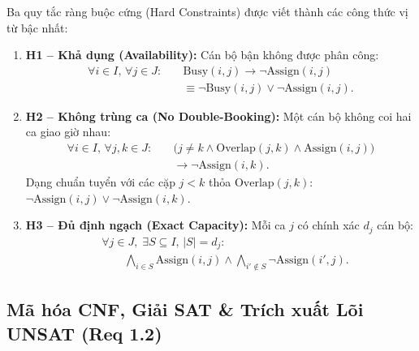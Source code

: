 Ba quy tắc ràng buộc cứng (Hard Constraints) được viết thành các công thức vị từ bậc nhất:
\begin{enumerate}
    \item \textbf{H1 -- Khả dụng (Availability):} Cán bộ bận không được phân công:
    \begin{equation}
    \begin{aligned}
        \forall i \in I, \, \forall j \in J: \quad
        &\text{Busy}(i, j) \rightarrow \neg \text{Assign}(i, j) \\
        &\equiv \neg \text{Busy}(i, j) \lor \neg \text{Assign}(i, j).
    \end{aligned}
    \end{equation}
    \item \textbf{H2 -- Không trùng ca (No Double-Booking):} Một cán bộ không coi hai ca giao giờ nhau:
    \begin{equation}
    \begin{aligned}
        \forall i \in I, \, \forall j, k \in J: \quad
        &\big( j \neq k \land \text{Overlap}(j, k) \land \text{Assign}(i, j) \big) \\
        &\rightarrow \neg \text{Assign}(i, k).
    \end{aligned}
    \end{equation}
    Dạng chuẩn tuyển với các cặp $j < k$ thỏa $\text{Overlap}(j, k)$: $\neg \text{Assign}(i, j) \lor \neg \text{Assign}(i, k)$.
    \item \textbf{H3 -- Đủ định ngạch (Exact Capacity):} Mỗi ca $j$ có chính xác $d_j$ cán bộ:
    \begin{equation}
    \begin{aligned}
        &\forall j \in J, \; \exists S \subseteq I, \, |S| = d_j: \\
        &\qquad \bigwedge_{i \in S} \text{Assign}(i, j) \land \bigwedge_{i' \notin S} \neg \text{Assign}(i', j).
    \end{aligned}
    \end{equation}
\end{enumerate}

\subsection{Mã hóa CNF, Giải SAT \& Trích xuất Lõi UNSAT (Req 1.2)}
\label{sec:m1_sat}

